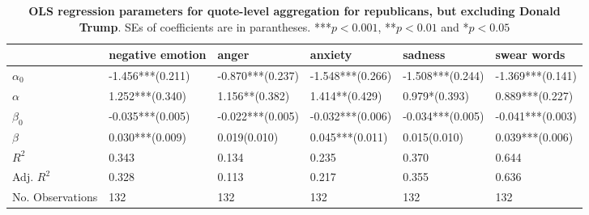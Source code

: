 \begin{table}[h]\centering
\caption{\textbf{OLS regression parameters for quote-level aggregation for republicans, but excluding Donald Trump}. SEs of coefficients are in parantheses. ***$p < 0.001$, **$p < 0.01$ and *$p < 0.05$}
	\label{fig: Party_3}
\begin{adjustbox}{width=\linewidth, center}
	\begin{tabular}{llllll}
	\toprule
	{} &            negative emotion &                                                     anger &                               anxiety &                                                   sadness &                 swear words \\
	\midrule
	$\alpha_0$       &            -1.456***(0.211) &                                          -0.870***(0.237) &                      -1.548***(0.266) &                                          -1.508***(0.244) &            -1.369***(0.141) \\
	$\alpha$         &  \phantom{-}1.252***(0.340) &                      \phantom{-}1.156**\phantom{*}(0.382) &  \phantom{-}1.414**\phantom{*}(0.429) &            \phantom{-}0.979*\phantom{*}\phantom{*}(0.393) &  \phantom{-}0.889***(0.227) \\
	$\beta_0$        &            -0.035***(0.005) &                                          -0.022***(0.005) &                      -0.032***(0.006) &                                          -0.034***(0.005) &            -0.041***(0.003) \\
	$\beta$          &  \phantom{-}0.030***(0.009) &  \phantom{-}0.019\phantom{*}\phantom{*}\phantom{*}(0.010) &            \phantom{-}0.045***(0.011) &  \phantom{-}0.015\phantom{*}\phantom{*}\phantom{*}(0.010) &  \phantom{-}0.039***(0.006) \\
	$R^2$            &                       0.343 &                                                     0.134 &                                 0.235 &                                                     0.370 &                       0.644 \\
	Adj. $R^2$       &                       0.328 &                                                     0.113 &                                 0.217 &                                                     0.355 &                       0.636 \\
	No. Observations &                         132 &                                                       132 &                                   132 &                                                       132 &                         132 \\
	\bottomrule
	\end{tabular}
	
\end{adjustbox}
	\end{table}

